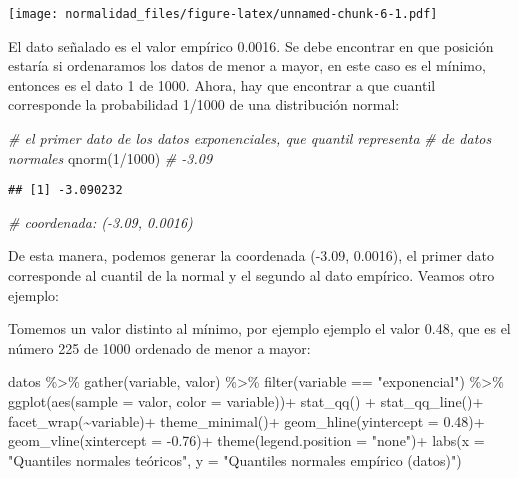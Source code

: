 \documentclass[
]{article}
\newenvironment{Shaded}{\begin{snugshade}}{\end{snugshade}}
\newcommand{\AttributeTok}[1]{\textcolor[rgb]{0.77,0.63,0.00}{#1}}
\newcommand{\CommentTok}[1]{\textcolor[rgb]{0.56,0.35,0.01}{\textit{#1}}}
\newcommand{\DecValTok}[1]{\textcolor[rgb]{0.00,0.00,0.81}{#1}}
\newcommand{\FloatTok}[1]{\textcolor[rgb]{0.00,0.00,0.81}{#1}}
\newcommand{\FunctionTok}[1]{\textcolor[rgb]{0.00,0.00,0.00}{#1}}
\newcommand{\NormalTok}[1]{#1}
\newcommand{\SpecialCharTok}[1]{\textcolor[rgb]{0.00,0.00,0.00}{#1}}
\newcommand{\StringTok}[1]{\textcolor[rgb]{0.31,0.60,0.02}{#1}}
\begin{document}
\texttt{[image: normalidad\_files/figure-latex/unnamed-chunk-6-1.pdf]}

El dato señalado es el valor empírico 0.0016. Se debe encontrar en que
posición estaría si ordenaramos los datos de menor a mayor, en este caso
es el mínimo, entonces es el dato 1 de 1000. Ahora, hay que encontrar a
que cuantil corresponde la probabilidad 1/1000 de una distribución
normal:

\begin{Shaded}
\begin{Highlighting}[]
\CommentTok{\# el primer dato de los datos exponenciales, que quantil representa }
\CommentTok{\# de datos normales}
\FunctionTok{qnorm}\NormalTok{(}\DecValTok{1}\SpecialCharTok{/}\DecValTok{1000}\NormalTok{) }\CommentTok{\# {-}3.09}
\end{Highlighting}
\end{Shaded}

\begin{verbatim}
## [1] -3.090232
\end{verbatim}

\begin{Shaded}
\begin{Highlighting}[]
\CommentTok{\# coordenada: ({-}3.09, 0.0016)}
\end{Highlighting}
\end{Shaded}

De esta manera, podemos generar la coordenada (-3.09, 0.0016), el primer
dato corresponde al cuantil de la normal y el segundo al dato empírico.
Veamos otro ejemplo:

Tomemos un valor distinto al mínimo, por ejemplo ejemplo el valor 0.48,
que es el número 225 de 1000 ordenado de menor a mayor:

\begin{Shaded}
\begin{Highlighting}[]
\NormalTok{datos }\SpecialCharTok{\%\textgreater{}\%} 
  \FunctionTok{gather}\NormalTok{(variable, valor) }\SpecialCharTok{\%\textgreater{}\%} \FunctionTok{filter}\NormalTok{(variable }\SpecialCharTok{==} \StringTok{"exponencial"}\NormalTok{) }\SpecialCharTok{\%\textgreater{}\%} 
  \FunctionTok{ggplot}\NormalTok{(}\FunctionTok{aes}\NormalTok{(}\AttributeTok{sample =}\NormalTok{ valor, }\AttributeTok{color =}\NormalTok{ variable))}\SpecialCharTok{+}
  \FunctionTok{stat\_qq}\NormalTok{() }\SpecialCharTok{+} \FunctionTok{stat\_qq\_line}\NormalTok{()}\SpecialCharTok{+}
  \FunctionTok{facet\_wrap}\NormalTok{(}\SpecialCharTok{\textasciitilde{}}\NormalTok{variable)}\SpecialCharTok{+}
  \FunctionTok{theme\_minimal}\NormalTok{()}\SpecialCharTok{+}
  \FunctionTok{geom\_hline}\NormalTok{(}\AttributeTok{yintercept =} \FloatTok{0.48}\NormalTok{)}\SpecialCharTok{+}
  \FunctionTok{geom\_vline}\NormalTok{(}\AttributeTok{xintercept =} \SpecialCharTok{{-}}\FloatTok{0.76}\NormalTok{)}\SpecialCharTok{+}
  \FunctionTok{theme}\NormalTok{(}\AttributeTok{legend.position =} \StringTok{"none"}\NormalTok{)}\SpecialCharTok{+}
  \FunctionTok{labs}\NormalTok{(}\AttributeTok{x =} \StringTok{"Quantiles normales teóricos"}\NormalTok{,}
       \AttributeTok{y =} \StringTok{"Quantiles normales empírico (datos)"}\NormalTok{)}
\end{Highlighting}
\end{Shaded}
\end{document}
